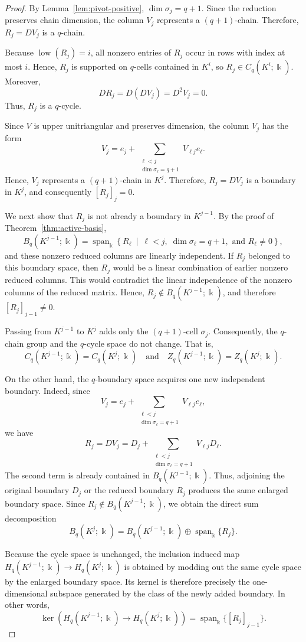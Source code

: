 \documentclass[11pt]{article}
\theoremstyle{paperdefinition}
\theoremstyle{paperplain}
\theoremstyle{paperremark}
\begin{document}
\begin{proof}
By Lemma~\ref{lem:pivot-positive}, $\dim\sigma_j=q+1$. Since the reduction preserves chain dimension, the column $V_j$ represents a $(q+1)$-chain. Therefore, $R_j=DV_j$ is a $q$-chain.

Because $\operatorname{low}(R_j)=i$, all nonzero entries of $R_j$ occur in rows with index at most $i$. Hence, $R_j$ is supported on $q$-cells contained in $K^i$, so $R_j\in C_q(K^i;\Bbbk)$. Moreover,
\[
DR_j = D(DV_j) = D^2V_j = 0.
\]
Thus, $R_j$ is a $q$-cycle.

Since $V$ is upper unitriangular and preserves dimension, the column $V_j$ has the form
\[
V_j = e_j + \sum_{\substack{\ell<j\\ \dim\sigma_\ell=q+1}} V_{\ell j}e_\ell.
\]
Hence, $V_j$ represents a $(q+1)$-chain in $K^j$. Therefore, $R_j=DV_j$ is a boundary in $K^j$, and consequently $[R_j]_j=0$.

We next show that $R_j$ is not already a boundary in $K^{j-1}$. By the proof of Theorem~\ref{thm:active-basis},
\[
B_q(K^{j-1};\Bbbk) = \operatorname{span}_{\Bbbk}\left\{R_\ell \ \middle|\ \ell<j,\; \dim\sigma_\ell=q+1, \text{ and } R_\ell\neq 0\right\},
\]
and these nonzero reduced columns are linearly independent. If $R_j$ belonged to this boundary space, then $R_j$ would be a linear combination of earlier nonzero reduced columns. This would contradict the linear independence of the nonzero columns of the reduced matrix. Hence, $R_j\notin B_q(K^{j-1};\Bbbk)$, and therefore $[R_j]_{j-1}\neq0$.

Passing from $K^{j-1}$ to $K^j$ adds only the $(q+1)$-cell $\sigma_j$. Consequently, the $q$-chain group and the $q$-cycle space do not change. That is, 
\[
C_q(K^{j-1};\Bbbk) = C_q(K^j;\Bbbk) \quad\text{and}\quad Z_q(K^{j-1};\Bbbk) = Z_q(K^j;\Bbbk).
\]

On the other hand, the $q$-boundary space acquires one new independent boundary. Indeed, since
\[
V_j = e_j + \sum_{\substack{\ell<j\\ \dim\sigma_\ell=q+1}} V_{\ell j}e_\ell,
\]
we have
\[
R_j = DV_j = D_j + \sum_{\substack{\ell<j\\ \dim\sigma_\ell=q+1}} V_{\ell j}D_\ell.
\]
The second term is already contained in $B_q(K^{j-1};\Bbbk)$. Thus, adjoining the original boundary $D_j$ or the reduced boundary $R_j$ produces the same enlarged boundary space. Since $R_j\notin B_q(K^{j-1};\Bbbk)$, we obtain the direct sum decomposition
\[
B_q(K^j;\Bbbk) = B_q(K^{j-1};\Bbbk) \oplus \operatorname{span}_{\Bbbk}\{R_j\}.
\]

Because the cycle space is unchanged, the inclusion induced map $H_q(K^{j-1};\Bbbk) \longrightarrow H_q(K^j;\Bbbk)$ is obtained by modding out the same cycle space by the enlarged boundary space. Its kernel is therefore precisely the one-dimensional subspace generated by the class of the newly added boundary. In other words,
\[
\ker\!\left(H_q(K^{j-1};\Bbbk) \longrightarrow H_q(K^j;\Bbbk) \right) = \operatorname{span}_{\Bbbk}\{[R_j]_{j-1}\}.
\]
\end{proof}
\end{document}
